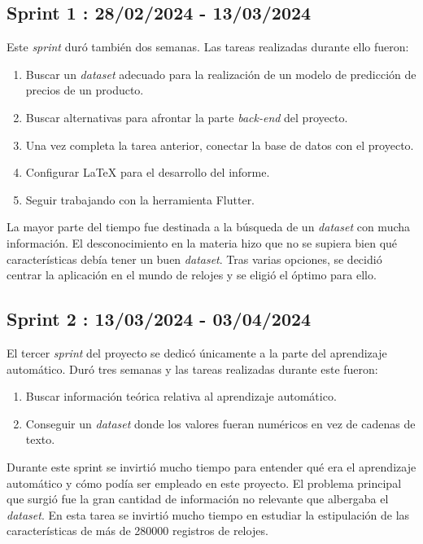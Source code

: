 \subsection{Sprint 1 : 28/02/2024 - 13/03/2024}

	Este \emph{sprint} duró también dos semanas. Las tareas realizadas durante ello fueron:
	\begin{enumerate}
		\item Buscar un \emph{dataset} adecuado para la realización de un modelo de predicción de precios de un producto.
		\item Buscar alternativas para afrontar la parte \emph{back-end} del proyecto.
		\item Una vez completa la tarea anterior, conectar la base de datos con el proyecto.
		\item Configurar LaTeX para el desarrollo del informe.
		\item Seguir trabajando con la herramienta Flutter.
	\end{enumerate}
	La mayor parte del tiempo fue destinada a la búsqueda de un \emph{dataset} con mucha información. El desconocimiento en la materia hizo que no se supiera bien qué características debía tener un buen \emph{dataset}. Tras varias opciones, se decidió centrar la aplicación en el mundo de relojes y se eligió el óptimo para ello.
	
\subsection{Sprint 2 : 13/03/2024 - 03/04/2024}

	El tercer \emph{sprint} del proyecto se dedicó únicamente a la parte del aprendizaje automático. Duró tres semanas y las tareas realizadas durante este fueron:
	\begin{enumerate}
		\item Buscar información teórica relativa al aprendizaje automático.
		\item Conseguir un \emph{dataset} donde los valores fueran numéricos en vez de cadenas de texto.
	\end{enumerate}
	Durante este sprint se invirtió mucho tiempo para entender qué era el aprendizaje automático y cómo podía ser empleado en este proyecto. El problema principal que surgió fue la gran cantidad de información no relevante que albergaba el \emph{dataset}. En esta tarea se invirtió mucho tiempo en estudiar la estipulación de las características de más de 280000 registros de relojes.

